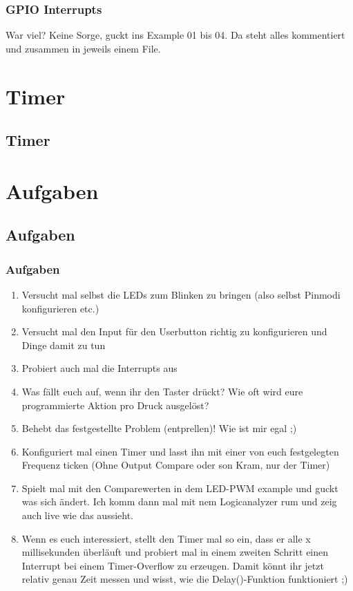 \documentclass[ngerman,compress]{beamer}
\begin{document}
\begin{frame} [fragile]
	\frametitle{GPIO Interrupts}
	War viel? Keine Sorge, guckt ins Example 01 bis 04. Da steht alles kommentiert und zusammen in jeweils einem File.
\end{frame}


\section{Timer}

\subsection{Timer}



\section{Aufgaben}
\subsection{Aufgaben}
\begin{frame}
	\frametitle{Aufgaben}
	\begin{enumerate}
		\item Versucht mal selbst die LEDs zum Blinken zu bringen (also selbst Pinmodi konfigurieren etc.)
		\item Versucht mal den Input für den Userbutton richtig zu konfigurieren und Dinge damit zu tun
		\item Probiert auch mal die Interrupts aus
		\item Was fällt euch auf, wenn ihr den Taster drückt? Wie oft wird eure programmierte Aktion pro Druck ausgelöst?
		\item Behebt das festgestellte Problem (entprellen)! Wie ist mir egal ;)

		\item Konfiguriert mal einen Timer und lasst ihn mit einer von euch festgelegten Frequenz ticken (Ohne Output Compare oder son Kram, nur der Timer)
		\item Spielt mal mit den Comparewerten in dem LED-PWM example und guckt was sich ändert. Ich komm dann mal mit nem Logicanalyzer rum und zeig auch live wie das aussieht.
		\item Wenn es euch interessiert, stellt den Timer mal so ein, dass er alle x millisekunden überläuft und probiert mal in einem zweiten Schritt einen Interrupt bei einem Timer-Overflow zu erzeugen. Damit könnt ihr jetzt relativ genau Zeit messen und wisst, wie die Delay()-Funktion funktioniert ;)
	\end{enumerate}
\end{frame}
\end{document}

